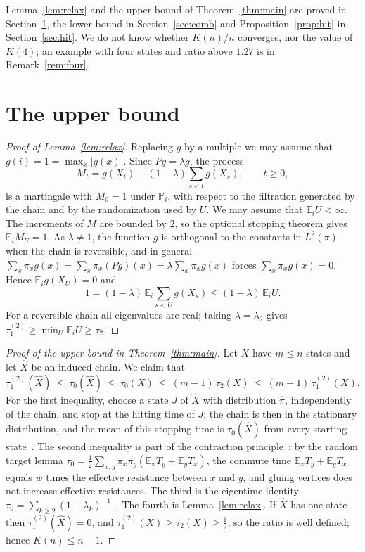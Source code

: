 \documentclass[11pt]{amsart}
\theoremstyle{definition}
\newcommand{\Prob}{\mathbb{P}}
\newcommand{\E}{\mathbb{E}}
\newcommand{\tmix}{\tau_1^{(2)}}
\newcommand{\hpi}{\widehat{\pi}}
\newcommand{\hX}{\widehat{X}}
\begin{document}
Lemma~\ref{lem:relax} and the upper bound of Theorem~\ref{thm:main} are proved in Section~\ref{sec:upper}, the lower
bound in Section~\ref{sec:comb} and Proposition~\ref{prop:hit} in Section~\ref{sec:hit}. We do not know whether
$K(n)/n$ converges, nor the value of $K(4)$; an example with four states and ratio above $1.27$ is in
Remark~\ref{rem:four}.

\section{The upper bound}\label{sec:upper}

\begin{proof}[Proof of Lemma~\ref{lem:relax}]
Replacing $g$ by a multiple we may assume that $g(i)=1=\max_x|g(x)|$. Since $Pg=\lambda g$, the process
\[
M_t=g(X_t)+(1-\lambda)\sum_{s<t}g(X_s),\qquad t\ge0,
\]
is a martingale with $M_0=1$ under $\Prob_i$, with respect to the filtration generated by the chain and by the
randomization used by $U$. We may assume that $\E_iU<\infty$. The increments of $M$ are bounded by $2$, so the optional
stopping theorem gives $\E_iM_U=1$. As $\lambda\ne1$, the function $g$ is orthogonal to the constants in $L^2(\pi)$
when the chain is reversible, and in general $\sum_x\pi_xg(x)=\sum_x\pi_x(Pg)(x)=\lambda\sum_x\pi_xg(x)$ forces
$\sum_x\pi_xg(x)=0$. Hence $\E_ig(X_U)=0$ and
\[
1=(1-\lambda)\,\E_i\sum_{s<U}g(X_s)\le(1-\lambda)\,\E_iU .
\]
For a reversible chain all eigenvalues are real; taking $\lambda=\lambda_2$ gives $\tmix\ge\min_U\E_iU\ge\tau_2$.
\end{proof}

\begin{proof}[Proof of the upper bound in Theorem~\ref{thm:main}]
Let $X$ have $m\le n$ states and let $\hX$ be an induced chain. We claim that
\begin{equation}\label{eq:chain}
\tmix(\hX)\ \le\ \tau_0(\hX)\ \le\ \tau_0(X)\ \le\ (m-1)\,\tau_2(X)\ \le\ (m-1)\,\tmix(X).
\end{equation}
For the first inequality, choose a state $J$ of $\hX$ with distribution $\hpi$, independently of the chain, and stop
at the hitting time of $J$; the chain is then in the stationary distribution, and the mean of this stopping time is
$\tau_0(\hX)$ from every starting state~\cite[Section~4.3]{AF}. The second inequality is part of the contraction
principle~\cite[Proposition~4.44]{AF}: by the random target lemma
$\tau_0=\tfrac12\sum_{x,y}\pi_x\pi_y(\E_xT_y+\E_yT_x)$, the commute time $\E_xT_y+\E_yT_x$ equals $w$ times the
effective resistance between $x$ and $y$, and gluing vertices does not increase effective resistances. The third is
the eigentime identity $\tau_0=\sum_{k\ge2}(1-\lambda_k)^{-1}$~\cite[Proposition~3.13 and Lemma~4.24]{AF}. The fourth
is Lemma~\ref{lem:relax}. If $\hX$ has one state then $\tmix(\hX)=0$, and $\tmix(X)\ge\tau_2(X)\ge\frac12$, so the
ratio is well defined; hence $K(n)\le n-1$.
\end{proof}
\end{document}
